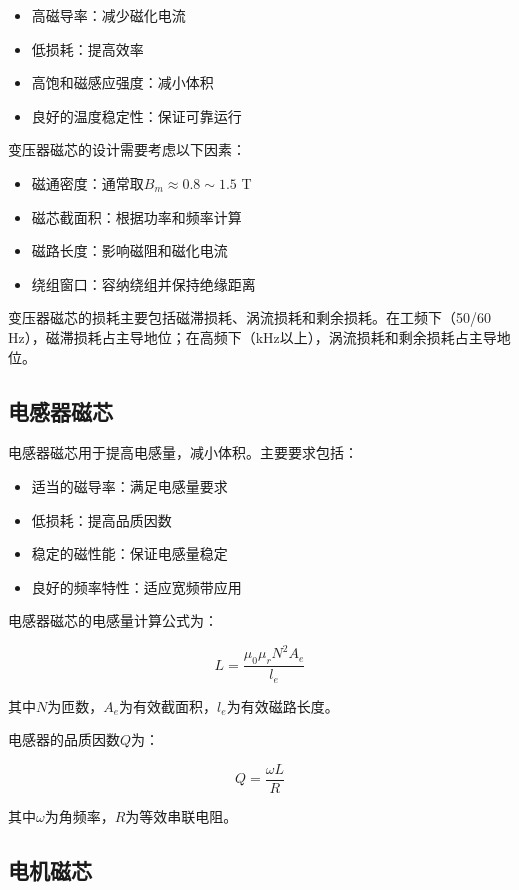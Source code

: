 \documentclass[12pt,UTF8]{ctexbook}
\begin{document}
\begin{itemize}[leftmargin=2cm]
    \item 高磁导率：减少磁化电流
    \item 低损耗：提高效率
    \item 高饱和磁感应强度：减小体积
    \item 良好的温度稳定性：保证可靠运行
\end{itemize}

变压器磁芯的设计需要考虑以下因素：

\begin{itemize}[leftmargin=2cm]
    \item 磁通密度：通常取$B_m \approx 0.8 \sim 1.5$ T
    \item 磁芯截面积：根据功率和频率计算
    \item 磁路长度：影响磁阻和磁化电流
    \item 绕组窗口：容纳绕组并保持绝缘距离
\end{itemize}

变压器磁芯的损耗主要包括磁滞损耗、涡流损耗和剩余损耗。在工频下（50/60 Hz），磁滞损耗占主导地位；在高频下（kHz以上），涡流损耗和剩余损耗占主导地位。

\subsection{电感器磁芯}

电感器磁芯用于提高电感量，减小体积。主要要求包括：

\begin{itemize}[leftmargin=2cm]
    \item 适当的磁导率：满足电感量要求
    \item 低损耗：提高品质因数
    \item 稳定的磁性能：保证电感量稳定
    \item 良好的频率特性：适应宽频带应用
\end{itemize}

电感器磁芯的电感量计算公式为：

$$ L = \frac{\mu_0 \mu_r N^2 A_e}{l_e} $$

其中$N$为匝数，$A_e$为有效截面积，$l_e$为有效磁路长度。

电感器的品质因数$Q$为：

$$ Q = \frac{\omega L}{R} $$

其中$\omega$为角频率，$R$为等效串联电阻。

\subsection{电机磁芯}
\end{document}
